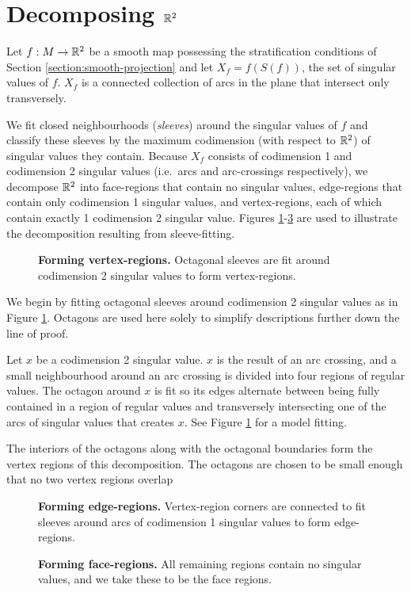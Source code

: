 \section{Decomposing $\mathbb{R}^2$}

Let $f:M\to\mathbb{R}^2$ be a smooth map possessing the stratification conditions of Section \ref{section:smooth-projection} and let $X_f = f(S(f))$, the set of singular values of $f$.
$X_f$ is a connected collection of arcs in the plane that intersect only transversely.

We fit closed neighbourhoods (\emph{sleeves}) around the singular values of $f$ and classify these sleeves by the maximum codimension (with respect to $\mathbb{R}^2$) of singular values they contain.
Because $X_f$ consists of codimension 1 and codimension 2 singular values (i.e.\ arcs and arc-crossings respectively), we decompose $\mathbb{R}^2$ into face-regions that contain no singular values, edge-regions that contain only codimension 1 singular values, and vertex-regions, each of which contain exactly 1 codimension 2 singular value.
Figures \ref{fig:vertex-sleeve}-\ref{fig:face-sleeve} are used to illustrate the decomposition resulting from sleeve-fitting.

\begin{figure}[h!]
	\label{fig:vertex-sleeve}
	\caption{
		\textbf{Forming vertex-regions.}
		Octagonal sleeves are fit around codimension 2 singular values to form vertex-regions.
	}
\end{figure}

We begin by fitting octagonal sleeves around codimension 2 singular values as in Figure \ref{fig:vertex-sleeve}.
Octagons are used here solely to simplify descriptions further down the line of proof.

Let $x$ be a codimension 2 singular value.
$x$ is the result of an arc crossing, and a small neighbourhood around an arc crossing is divided into four regions of regular values.
The octagon around $x$ is fit so its edges alternate between being fully contained in a region of regular values and transversely intersecting one of the arcs of singular values that creates $x$.
See Figure \ref{fig:vertex-sleeve} for a model fitting.

The interiors of the octagons along with the octagonal boundaries form the vertex regions of this decomposition.
The octagons are chosen to be small enough that no two vertex regions overlap

\begin{figure}[h!]
	\label{fig:edge-sleeve}
	\caption{
		\textbf{Forming edge-regions.}
		Vertex-region corners are connected to fit sleeves around arcs of codimension 1 singular values to form edge-regions.
	}
\end{figure}



\begin{figure}[h!]
	\label{fig:face-sleeve}
	\caption{
		\textbf{Forming face-regions.}
		All remaining regions contain no singular values, and we take these to be the face regions.
	}
\end{figure}
